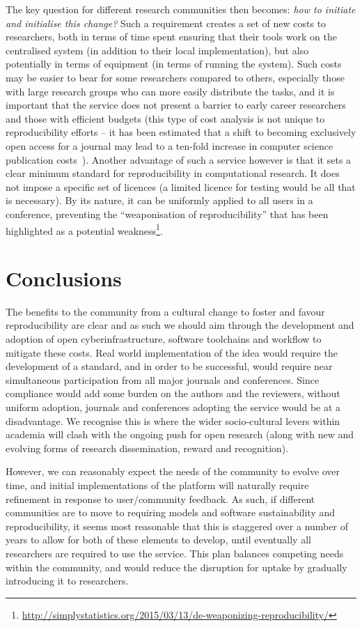 \documentclass[conference]{IEEEtran}
\begin{document}
The key question for different research communities then becomes:
{\emph{how to initiate and initialise this change?}} Such a
requirement creates a set of new costs to researchers, both in terms
of time spent ensuring that their tools work on the centralised system
(in addition to their local implementation), but also potentially in
terms of equipment (in terms of running the system).  Such costs may
be easier to bear for some researchers compared to others, especially
those with large research groups who can more easily distribute the
tasks, and it is important that the service does not present a barrier
to early career researchers and those with efficient budgets (this
type of cost analysis is not unique to reproducibility efforts -- it
has been estimated that a shift to becoming exclusively open access
for a journal may lead to a ten-fold increase in computer science
publication costs~\cite{vardi-cacm-2014}). Another advantage of such a
service however is that it sets a clear minimum standard for
reproducibility in computational research. It does not impose a
specific set of licences (a limited licence for testing would be all
that is necessary). By its nature, it can be uniformly applied to all
users in a conference, preventing the ``weaponisation of
reproducibility'' that has been highlighted as a potential
weakness\footnote{\url{http://simplystatistics.org/2015/03/13/de-weaponizing-reproducibility/}}.


\section{Conclusions}\label{concl}

The benefits to the community from a cultural change to foster and
favour reproducibility are clear and as such we should aim through the
development and adoption of open cyberinfrastructure, software
toolchains and workflow to mitigate these costs. Real world
implementation of the idea would require the development of a
standard, and in order to be successful, would require near
simultaneous participation from all major journals and conferences.
Since compliance would add some burden on the authors and the
reviewers, without uniform adoption, journals and conferences adopting
the service would be at a disadvantage. We recognise this is where the
wider socio-cultural levers within academia will clash with the
ongoing push for open research (along with new and evolving forms of
research dissemination, reward and recognition).

However, we can reasonably expect the needs of the community to evolve
over time, and initial implementations of the platform will naturally
require refinement in response to user/community feedback. As such, if
different communities are to move to requiring models and software
sustainability and reproducibility, it seems most reasonable that this
is staggered over a number of years to allow for both of these
elements to develop, until eventually all researchers are required to
use the service. This plan balances competing needs within the
community, and would reduce the disruption for uptake by gradually
introducing it to researchers.
\end{document}
